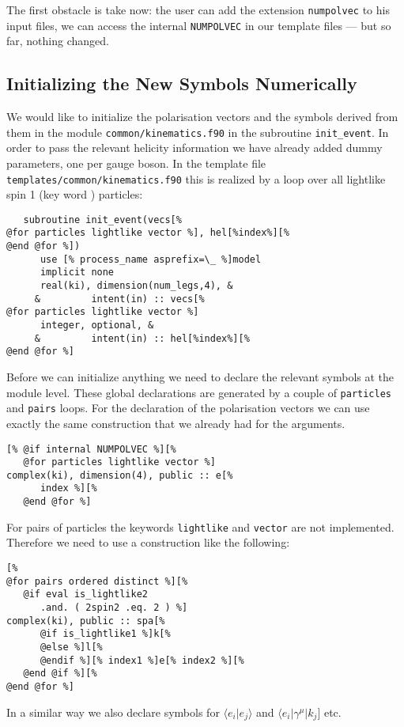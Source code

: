 \documentclass[11pt,a4paper]{refrep}
\begin{document}
The first obstacle is take now: the user can add the extension
\texttt{numpolvec} to his input files, we can access the internal
\texttt{NUMPOLVEC} in our template files --- but so far, nothing changed.

\subsection{Initializing the New Symbols Numerically}
We would like to initialize the polarisation vectors and the
symbols derived from them in the module
\texttt{common/\hspace{0pt}kinematics.f90} in the subroutine
\texttt{init\_event}. In order to pass the relevant helicity information
we have already added dummy parameters, one per gauge boson.
In the template file
\texttt{templates/\hspace{0pt}common/\hspace{0pt}kinematics.f90}
this is realized by a loop over all lightlike spin 1 (key word
) particles:
\begin{lstlisting}
   subroutine init_event(vecs[%
@for particles lightlike vector %], hel[%index%][%
@end @for %])
      use [% process_name asprefix=\_ %]model
      implicit none
      real(ki), dimension(num_legs,4), &
     &         intent(in) :: vecs[%
@for particles lightlike vector %]
      integer, optional, &
     &         intent(in) :: hel[%index%][%
@end @for %]
\end{lstlisting}

Before we can initialize anything we need to declare the relevant
symbols at the module level. These global declarations are generated
by a couple of \texttt{particles} and \texttt{pairs} loops.
For the declaration of the polarisation vectors we can use exactly
the same construction that we already had for the arguments.
\begin{lstlisting}
[% @if internal NUMPOLVEC %][%
   @for particles lightlike vector %]
complex(ki), dimension(4), public :: e[%
      index %][%
   @end @for %]
\end{lstlisting}

For pairs of particles the keywords \texttt{lightlike} and
\texttt{vector} are not implemented. Therefore we need to use
a construction like the following:
\begin{lstlisting}
[%
@for pairs ordered distinct %][%
   @if eval is_lightlike2
      .and. ( 2spin2 .eq. 2 ) %]
complex(ki), public :: spa[%
      @if is_lightlike1 %]k[%
      @else %]l[%
      @endif %][% index1 %]e[% index2 %][%
   @end @if %][%
@end @for %]
\end{lstlisting}
In a similar way we also declare symbols for $\langle e_i\vert e_j\rangle$
and $\langle e_i\vert\gamma^\mu\vert k_j]$ etc.
\end{document}
